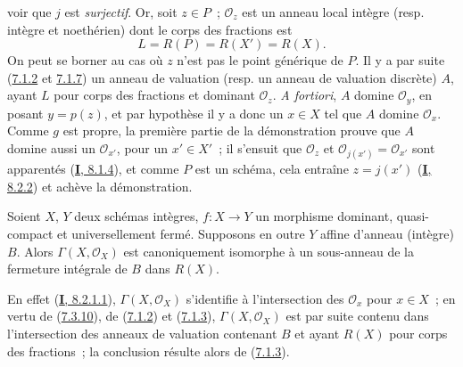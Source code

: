 \begin{enumerate}
voir que $j$ est \emph{surjectif}. Or, soit $z\in P$~; $\mathcal{O}_z$ est un
anneau local intègre (resp. intègre et noethérien) dont le corps des fractions
est
\[
L=R(P)=R(X')=R(X).
\]
On peut se borner au cas où $z$ n'est pas le point générique de $P$. Il y a par
suite (\hyperref[II.7.1.2-fr]{7.1.2} et
\hyperref[II.7.1.7-fr]{7.1.7}) un anneau de valuation (resp. un anneau de
valuation discrète) $A$, ayant $L$ pour corps des fractions et dominant
$\mathcal{O}_z$. \emph{A fortiori}, $A$ domine $\mathcal{O}_y$, en posant
$y=p(z)$, et par hypothèse il y a donc un $x\in X$ tel que $A$ domine
$\mathcal{O}_x$. Comme $g$ est propre, la première partie de la démonstration
prouve que $A$ domine aussi un $\mathcal{O}_{x'}$, pour un $x'\in X'$~; il
s'ensuit que $\mathcal{O}_z$ et $\mathcal{O}_{j(x')}=\mathcal{O}_{x'}$ sont
apparentés (\hyperref[I.8.1.4-fr]{\textbf{I}, 8.1.4}), et comme $P$ est un schéma, cela
entraîne $z=j(x')$ (\hyperref[I.8.2.2-fr]{\textbf{I}, 8.2.2}) et achève la démonstration.
\end{enumerate}

\begin{corollary}[7.3.11]
\label{II.7.3.11-fr}
Soient $X$, $Y$ deux schémas intègres, $f:X\to Y$ un morphisme dominant,
quasi-compact et universellement fermé. Supposons en outre $Y$ affine d'anneau
(intègre) $B$. Alors $\Gamma(X,\mathcal{O}_X)$ est canoniquement isomorphe à
un sous-anneau de la fermeture intégrale de $B$ dans $R(X)$.
\end{corollary}

En effet (\hyperref[I.8.2.1.1-fr]{\textbf{I}, 8.2.1.1}),
$\Gamma(X,\mathcal{O}_X)$ s'identifie à l'intersection des $\mathcal{O}_x$ pour
$x\in X$~; en vertu de (\hyperref[II.7.3.10-fr]{7.3.10}), de
(\hyperref[II.7.1.2-fr]{7.1.2}) et (\hyperref[II.7.1.3-fr]{7.1.3}),
$\Gamma(X,\mathcal{O}_X)$ est par suite contenu dans l'intersection des
anneaux de valuation contenant $B$ et ayant $R(X)$ pour corps des fractions~;
la conclusion résulte alors de (\hyperref[II.7.1.3-fr]{7.1.3}).

